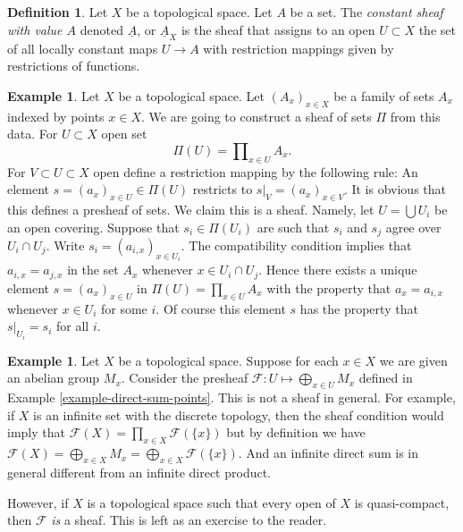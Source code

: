 \documentclass{stacks-project}
\theoremstyle{plain}
\theoremstyle{definition}
\newtheorem{definition}[subsection]{Definition}
\newtheorem{example}[subsection]{Example}
\theoremstyle{remark}
\numberwithin{equation}{subsection}
\begin{document}
\begin{definition}
\label{definition-constant-sheaf}
Let $X$ be a topological space. Let $A$ be a set.
The {\it constant sheaf with value $A$} denoted $\underline{A}$, or
$\underline{A}_X$ is the sheaf that assigns to an open $U \subset X$
the set of all locally constant maps $U \to A$ with restriction mappings
given by restrictions of functions.
\end{definition}

\begin{example}
\label{example-sheaf-product-pointwise}
Let $X$ be a topological space. Let $(A_x)_{x \in X}$ be
a family of sets $A_x$ indexed by points $x \in X$. We are
going to construct a sheaf of sets $\Pi$ from this data.
For $U \subset X$ open set
$$
\Pi(U) = \prod\nolimits_{x \in U} A_x.
$$
For $V \subset U \subset X$ open define
a restriction mapping by the following rule: An element
$s = (a_x)_{x\in U} \in \Pi(U)$ restricts
to $s|_V = (a_x)_{x \in V}$. It is obvious that this
defines a presheaf of sets. We claim this is a sheaf.
Namely, let $U = \bigcup U_i$ be an open covering.
Suppose that $s_i \in \Pi(U_i)$ are
such that $s_i$ and $s_j$ agree over $U_i \cap U_j$. Write
$s_i = (a_{i, x})_{x\in U_i}$. The compatibility condition implies that
$a_{i, x} = a_{j, x}$ in the set $A_x$ whenever $x \in U_i \cap U_j$.
Hence there exists a unique element $s = (a_x)_{x\in U}$
in $\Pi(U) = \prod_{x\in U} A_x$ with the property that
$a_x = a_{i, x}$ whenever $x \in U_i$ for some $i$. Of course this
element $s$ has the property that $s|_{U_i} = s_i$ for all $i$.
\end{example}

\begin{example}
\label{example-direct-sum-points-not-sheaf}
Let $X$ be a topological space.
Suppose for each $x\in X$ we are given an abelian group $M_x$.
Consider the presheaf $\mathcal{F} : U \mapsto \bigoplus_{x \in U} M_x$
defined in Example \ref{example-direct-sum-points}. This
is not a sheaf in general. For example, if $X$ is an infinite set
with the discrete topology, then the sheaf condition
would imply that $\mathcal{F}(X) = \prod_{x\in X} \mathcal{F}(\{x\})$
but by definition we have $\mathcal{F}(X)
= \bigoplus_{x \in X} M_x = \bigoplus_{x \in X} \mathcal{F}(\{x\})$.
And an infinite direct sum is in general different from an infinite
direct product.

\medskip\noindent
However, if $X$ is a topological space such that every open
of $X$ is quasi-compact, then $\mathcal{F}$ {\it is} a sheaf.
This is left as an exercise to the reader.
\end{example}
\end{document}
